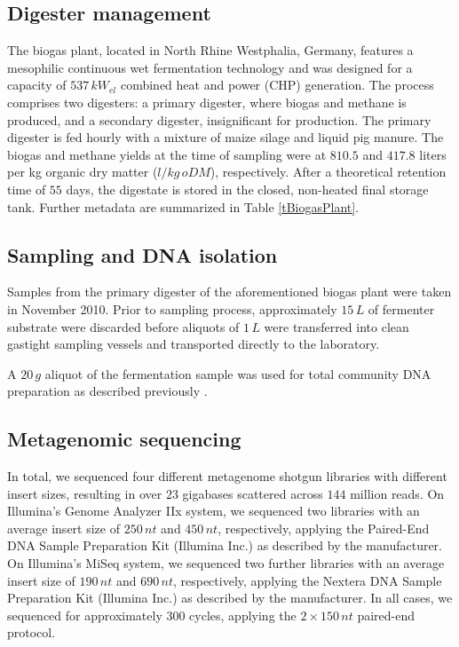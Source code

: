 \documentclass{bmcart}
\begin{document}
\subsection*{Digester management}
The biogas plant, located in North Rhine Westphalia, Germany, features a mesophilic continuous wet fermentation technology and was designed for a capacity of $537\,kW_{el}$ combined heat and power (CHP) generation.
The process comprises two digesters: a primary digester, where biogas and methane is produced, and a secondary digester, insignificant for production.
The primary digester is fed hourly with a mixture of maize silage and liquid pig manure.
The biogas and methane yields at the time of sampling were at $810.5$ and $417.8$ liters per kg organic dry matter ($l / kg\,oDM$), respectively.
After a theoretical retention time of $55$ days, the digestate is stored in the closed, non-heated final storage tank.
Further metadata are summarized in Table \ref{tBiogasPlant}.
%
\subsection*{Sampling and DNA isolation}
Samples from the primary digester of the aforementioned biogas plant were taken in November 2010.
Prior to sampling process, approximately $15\,L$ of fermenter substrate were discarded before aliquots of $1\,L$ were transferred into clean gastight sampling vessels and transported directly to the laboratory.

A $20\,g$ aliquot of the fermentation sample was used for total community DNA preparation as described previously \cite{Schlueter2008}.
%
\subsection*{Metagenomic sequencing}
In total, we sequenced four different metagenome shotgun libraries with different insert sizes, resulting in over $23$ gigabases scattered across $144$ million reads.
On Illumina's Genome Analyzer IIx system, we sequenced two libraries with an average insert size of $250\,nt$ and $450\,nt$, respectively, applying the Paired-End DNA Sample Preparation Kit (Illumina Inc.) as described by the manufacturer.
On Illumina's MiSeq system, we sequenced two further libraries with an average insert size of $190\,nt$ and $690\,nt$, respectively, applying the Nextera DNA Sample Preparation Kit (Illumina Inc.) as described by the manufacturer.
In all cases, we sequenced for approximately 300 cycles, applying the $2 \times 150\,nt$ paired-end protocol.
%
\end{document}

